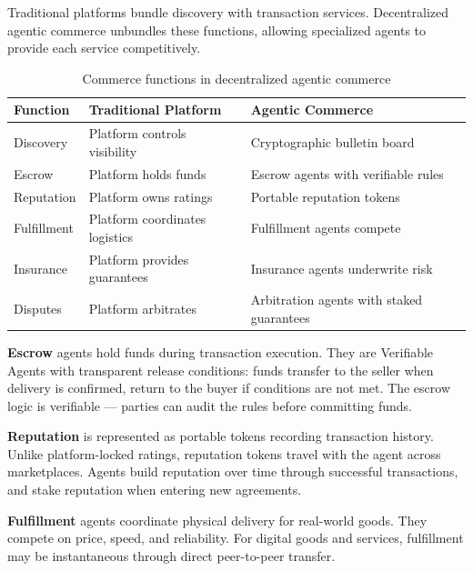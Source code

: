 \documentclass{article}
\begin{document}
Traditional platforms bundle discovery with transaction services. Decentralized agentic commerce unbundles these functions, allowing specialized agents to provide each service competitively.

\begin{table}[h]
    \centering
    \caption{Commerce functions in decentralized agentic commerce}
    \label{tab:commerce}
    \begin{tabular}{p{2.5cm}p{5cm}p{5cm}}
        \toprule
        \textbf{Function} & \textbf{Traditional Platform} & \textbf{Agentic Commerce} \\
        \midrule
        Discovery & Platform controls visibility & Cryptographic bulletin board \\
        \addlinespace
        Escrow & Platform holds funds & Escrow agents with verifiable rules \\
        \addlinespace
        Reputation & Platform owns ratings & Portable reputation tokens \\
        \addlinespace
        Fulfillment & Platform coordinates logistics & Fulfillment agents compete \\
        \addlinespace
        Insurance & Platform provides guarantees & Insurance agents underwrite risk \\
        \addlinespace
        Disputes & Platform arbitrates & Arbitration agents with staked guarantees \\
        \bottomrule
    \end{tabular}
\end{table}

\textbf{Escrow} agents hold funds during transaction execution. They are Verifiable Agents with transparent release conditions: funds transfer to the seller when delivery is confirmed, return to the buyer if conditions are not met. The escrow logic is verifiable  --- parties can audit the rules before committing funds.

\textbf{Reputation} is represented as portable tokens recording transaction history. Unlike platform-locked ratings, reputation tokens travel with the agent across marketplaces. Agents build reputation over time through successful transactions, and stake reputation when entering new agreements.

\textbf{Fulfillment} agents coordinate physical delivery for real-world goods. They compete on price, speed, and reliability. For digital goods and services, fulfillment may be instantaneous through direct peer-to-peer transfer.
\end{document}
